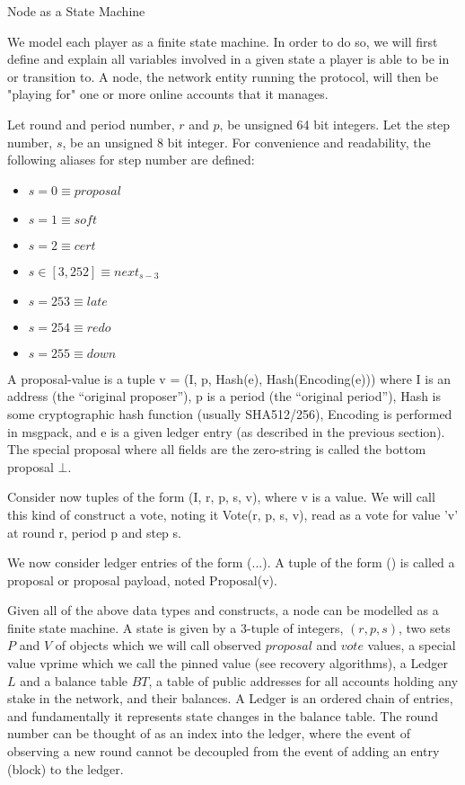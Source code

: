 \documentclass[10pt,a4paper]{article}
\begin{document}
\begin{section}{Node as a State Machine}

We model each player as a finite state machine. In order to do so, we will first
define and explain all variables involved in a given state a player is able to be in or transition to.
A node, the network entity running the protocol, will then be "playing for" one or more online accounts that it manages.

Let round and period number, $r$ and $p$, be unsigned 64 bit integers. Let the 
step number, $s$, be an unsigned  8 bit integer.
For convenience and readability, the following aliases for step number are defined:
\begin{itemize}
    \item $s=0 \equiv proposal$
    \item $s=1 \equiv soft$
    \item $s=2 \equiv cert$
    \item $s \in [3,252] \equiv next_{s-3}$
    \item $s=253 \equiv late$
    \item $s=254 \equiv redo$
    \item $s=255 \equiv down$
\end{itemize}


A proposal-value is a tuple v = (I, p, Hash(e), Hash(Encoding(e))) where I is
an address (the “original proposer”), p is a period (the “original period”),
Hash is some cryptographic hash function (usually SHA512/256), Encoding is
performed in msgpack, and e is a given ledger entry (as described in the previous section).
The special proposal where all fields are the zero-string is called the bottom proposal $\bot$.



Consider now tuples of the form (I, r, p, s, v), where v is a value.
We will call this kind of construct a vote, noting it Vote(r, p, s, v), read as
a vote for value 'v' at round r, period p and step s.

We now consider ledger entries of the form (...).
A tuple of the form () is called a proposal or proposal payload, noted Proposal(v).

Given all of the above data types and constructs, a node can be modelled as 
a finite state machine. A state is given by a 3-tuple of integers, $(r, p, s)$, 
two sets $P$ and $V$ of objects which we will call observed $proposal$ and $vote$ values, 
a special value vprime which we call the pinned value (see recovery algorithms),
a Ledger $L$ and a balance table $BT$, a table of public addresses for all 
accounts holding any stake in the network, and their balances. A Ledger is an 
ordered chain of entries, and fundamentally it represents state changes in the balance table.
The round number can be thought of as an index into the ledger, where the event of observing
a new round cannot be decoupled from the event of adding an entry (block) to the ledger.




\end{section}
\end{document}
